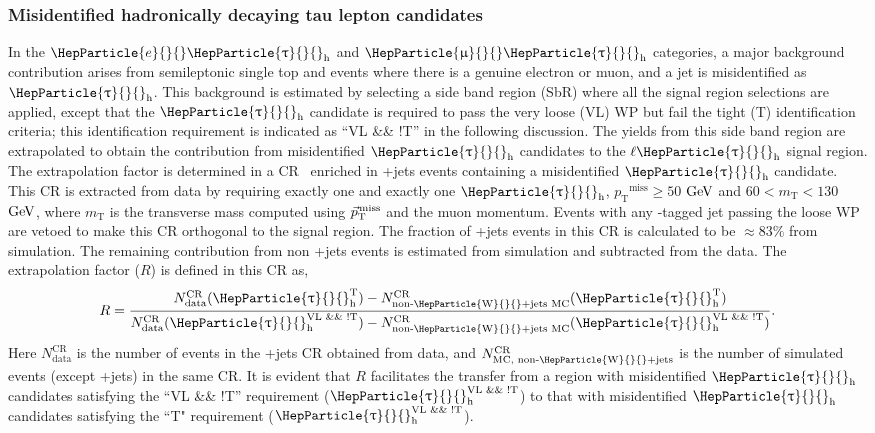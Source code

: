 \documentclass[12pt, a4paper]{article}
\newcommand{\pt}{\ensuremath{p_{\mathrm{T}}}\xspace}
\newcommand{\ptmiss}{\ensuremath{\pt^\text{miss}}}
\newcommand{\mT}{\ensuremath{m_{\mathrm{T}}}\xspace}
\newcommand{\ptvecmiss}{\ensuremath{{\vec p}_{\mathrm{T}}^{\kern1pt\text{miss}}}\xspace}
\newcommand{\GeV}{\ensuremath{\text{Ge\hspace{-.08em}V}}{}\xspace}
\DeclareRobustCommand{\PW}{{\HepParticle{W}{}{}}\xspace}
\DeclareRobustCommand{\PQb}{{\HepParticle{b}{}{}}\xspace} %
\DeclareRobustCommand{\PQt}{\HepParticle{t}{}{}} %
\DeclareRobustCommand{\PAQt}{{\HepAntiParticle{\PQt}{}{}}\xspace} %
\DeclareRobustCommand{\Pe}{{\HepParticle{e}{}{}}\xspace} %
\DeclareRobustCommand{\PGm}{{\HepParticle{\upmu}{}{}}\xspace} %
\DeclareRobustCommand{\PGt}{{\HepParticle{\uptau}{}{}}\xspace} %
\newcommand{\ttbar}{\PQt{}\PAQt} %
\newcommand{\tauh}{\ensuremath{\PGt_\mathrm{h}}\xspace}
\begin{document}
\subsubsection{Misidentified hadronically decaying tau lepton candidates}\label{fakeBkg_est}
In the $\Pe\tauh$ and $\PGm\tauh$ categories, a major background contribution arises from semileptonic single top and \ttbar events where there is a genuine electron or muon, and a jet is misidentified as $\tauh$.
This background is estimated by selecting a side band region (SbR) where all the signal region selections are applied, except that the $\tauh$ candidate is required to pass the very loose (VL) WP but fail the tight (T) identification criteria; this identification requirement is indicated as ``VL \&\& !T'' in the following discussion.
The yields from this side band region are extrapolated to obtain the contribution from misidentified \tauh candidates to the $\ell\tauh$ signal region.
The extrapolation factor is determined in a CR~\cite{CMS:2019eln} enriched in {\PW}+jets events containing a misidentified \tauh candidate.
This CR is extracted from data by requiring exactly one \PGm and exactly one $\tauh$, $\ptmiss\ge50$ \GeV and $60<\mT<130$ \GeV, where \mT is the transverse mass computed using \ptvecmiss and the muon momentum.
Events with any \PQb-tagged jet passing the loose WP are vetoed to make this CR orthogonal to the signal region.
The fraction of {\PW}+jets events in this CR is calculated to be $\approx83\%$ from simulation.
The remaining contribution from non {\PW}+jets events is estimated from simulation and subtracted from the data.
The extrapolation factor ($R$) is defined in this CR as,
	\begin{equation}
	R =
	\frac{N_\text{data}^\text{CR} (\tauh^{\text{T}}) - N_\text{non-{\PW}+jets MC}^\text{CR} (\tauh^{\text{T}})}
	{N_\text{data}^\text{CR} (\tauh^{\text{VL \&\& !T}})-N_\text{non-{\PW}+jets MC}^{\text{CR}}(\tauh^{\text{VL \&\& !T}})} .
	\label{eq:transferFactor}
	\end{equation}
Here $N_{\text{data}}^{\text{CR}}$ is the number of events in the {\PW}+jets CR obtained from data, and $N_\text{MC, non-{\PW}+jets}^\text{CR}$ is the number of simulated events (except {\PW}+jets) in the same CR.
It is evident that $R$ facilitates the transfer from a region with misidentified \tauh candidates satisfying the ``VL \&\& !T'' requirement ($\tauh^{\text{VL \&\& !T}}$) to that with misidentified \tauh candidates satisfying the ``T" requirement ($\tauh^{\text{VL \&\& !T}}$).
\end{document}
